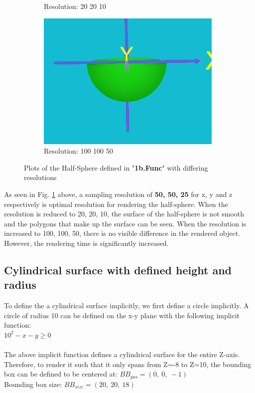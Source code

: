 \documentclass[acmlarge,nonacm=true]{acmart}
\begin{document}
\begin{figure}[H]
\begin{subfigure}{.33\textwidth}
	  \caption{Resolution: 20 20 10}
	\end{subfigure}%
	\begin{subfigure}{.33\textwidth}
		\centering
		\includegraphics[width=.8\linewidth]{fig/1b100_100_50}
		\caption{Resolution: 100 100 50}
	  \end{subfigure}
	\caption{Plots of the Half-Sphere defined in "\textbf{1b.Func}" with differing resolutions}
	\label{fig:1b}
\end{figure}

As seen in Fig. \ref{fig:1b} above, a sampling resolution of \textbf{50, 50, 25} for x, y and z respectively is optimal 
resolution for rendering the half-sphere. When the resolution is reduced to 20, 20, 10, the surface of the half-sphere is 
not smooth and the polygons that make up the surface can be seen. When the resolution is increased to 100, 100, 50, there 
is no visible difference in the rendered object. However, the rendering time is significantly increased.

\newpage
\subsection{Cylindrical surface with defined height and radius}
\label{section:1c}
To define the a cylindrical surface implicitly, we first define a circle implicitly.
A circle of radius 10 can be defined on the x-y plane with the following implicit function:\\
$10^2 - x - y \geq 0$\\\\

The above implicit function defines a cylindrical surface for the entire Z-axis. Therefore, to render 
it such that it only spans from Z=-8 to Z=10, the bounding box can be defined to be centered at: 
$BB_{pos} = (0,\ 0,\ -1)$\\
Bounding box size: $BB_{size} = (20,\ 20,\ 18)$\\\\ 
\end{document}

